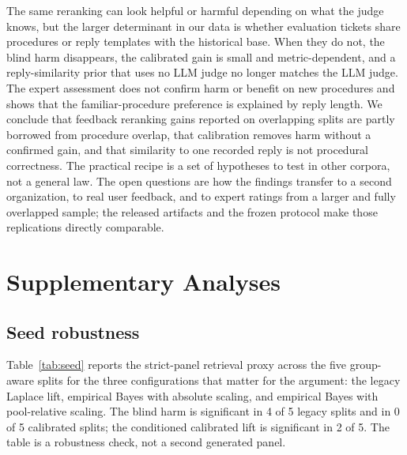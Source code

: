 \documentclass{ieeeaccess}
\begin{document}
The same reranking can look helpful or harmful depending on what the judge knows,
but the larger determinant in our data is whether evaluation tickets share
procedures or reply templates with the historical base. When they do not, the blind
harm disappears, the calibrated gain is small and metric-dependent, and a
reply-similarity prior that uses no LLM judge no longer matches the LLM judge. The
expert assessment does not confirm harm or benefit on new procedures and shows that
the familiar-procedure preference is explained by reply length. We conclude that feedback reranking gains
reported on overlapping splits are partly borrowed from procedure overlap, that
calibration removes harm without a confirmed gain, and that similarity to one
recorded reply is not procedural correctness. The practical recipe is a set of
hypotheses to test in other corpora, not a general law. The open questions are how
the findings transfer to a second organization, to real user feedback, and to
expert ratings from a larger and fully overlapped sample; the released artifacts
and the frozen protocol make those replications directly comparable.


\appendix
\section{Supplementary Analyses}
\label{sec:appendix}

\subsection{Seed robustness}
Table~\ref{tab:seed} reports the strict-panel retrieval proxy across the five
group-aware splits for the three configurations that matter for the argument: the
legacy Laplace lift, empirical Bayes with absolute scaling, and empirical Bayes with
pool-relative scaling. The blind harm is significant in 4 of 5 legacy splits and in
0 of 5 calibrated splits; the conditioned calibrated lift is significant in 2 of 5.
The table is a robustness check, not a second generated panel.
\end{document}
